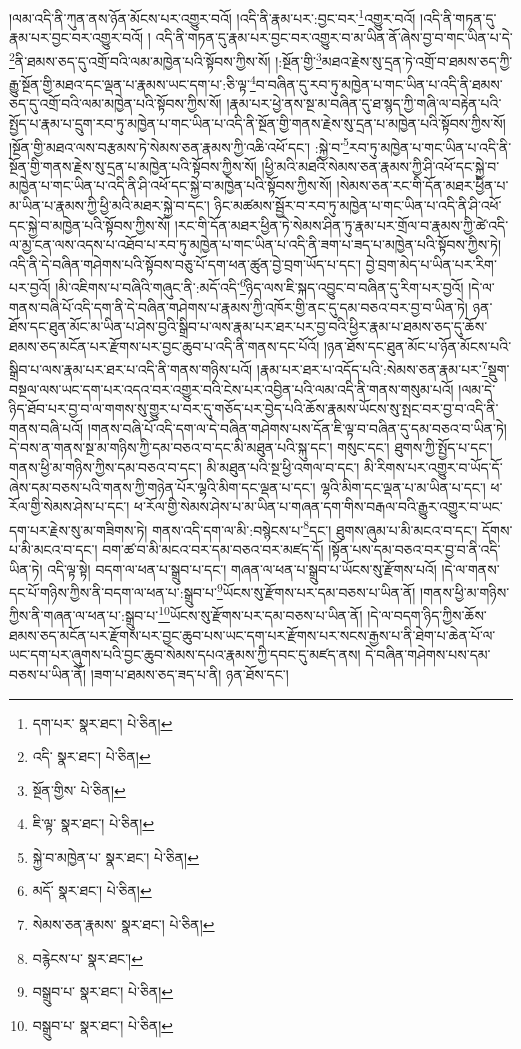 །ལམ་འདི་ནི་ཀུན་ནས་ཉོན་མོངས་པར་འགྱུར་བའོ། །འདི་ནི་རྣམ་པར་:བྱང་བར་\footnote{དག་པར་  སྣར་ཐང་།  པེ་ཅིན། }འགྱུར་བའོ། །འདི་ནི་གཏན་དུ་རྣམ་པར་བྱང་བར་འགྱུར་བའོ། །
འདི་ནི་གཏན་དུ་རྣམ་པར་བྱང་བར་འགྱུར་བ་མ་ཡིན་ནོ་ཞེས་བྱ་བ་གང་ཡིན་པ་དེ་\footnote{འདི་  སྣར་ཐང་།  པེ་ཅིན། }ནི་ཐམས་ཅད་དུ་འགྲོ་བའི་ལམ་མཁྱེན་པའི་སྟོབས་ཀྱིས་སོ། །:སྔོན་གྱི་\footnote{སྔོན་གྱིས་  པེ་ཅིན། }མཐའ་རྗེས་སུ་དྲན་ཏེ་འགྲོ་བ་ཐམས་ཅད་ཀྱི་རྒྱུ་སྔོན་གྱི་མཐའ་དང་ལྡན་པ་རྣམས་ཡང་དག་པ་:ཅི་ལྟ་\footnote{ཇི་ལྟ་  སྣར་ཐང་།  པེ་ཅིན། }བ་བཞིན་དུ་རབ་ཏུ་མཁྱེན་པ་གང་ཡིན་པ་འདི་ནི་ཐམས་ཅད་དུ་འགྲོ་བའི་ལམ་མཁྱེན་པའི་སྟོབས་ཀྱིས་སོ། །རྣམ་པར་ཕྱེ་ནས་སྔ་མ་བཞིན་དུ་ཐ་སྙད་ཀྱི་གཞི་ལ་བརྟེན་པའི་སྤྱོད་པ་རྣམ་པ་དྲུག་རབ་ཏུ་མཁྱེན་པ་གང་ཡིན་པ་འདི་ནི་སྔོན་གྱི་གནས་རྗེས་སུ་དྲན་པ་མཁྱེན་པའི་སྟོབས་ཀྱིས་སོ། །སྔོན་གྱི་མཐའ་ལས་བརྩམས་ཏེ་སེམས་ཅན་རྣམས་ཀྱི་འཆི་འཕོ་དང་། :སྐྱེ་བ་\footnote{སྐྱེ་བ་མཁྱེན་པ་  སྣར་ཐང་།  པེ་ཅིན། }རབ་ཏུ་མཁྱེན་པ་གང་ཡིན་པ་འདི་ནི་སྔོན་གྱི་གནས་རྗེས་སུ་དྲན་པ་མཁྱེན་པའི་སྟོབས་ཀྱིས་སོ། །ཕྱི་མའི་མཐའི་སེམས་ཅན་རྣམས་ཀྱི་ཤི་འཕོ་དང་སྐྱེ་བ་མཁྱེན་པ་གང་ཡིན་པ་འདི་ནི་ཤི་འཕོ་དང་སྐྱེ་བ་མཁྱེན་པའི་སྟོབས་ཀྱིས་སོ། །སེམས་ཅན་རང་གི་དོན་མཐར་ཕྱིན་པ་མ་ཡིན་པ་རྣམས་ཀྱི་ཕྱི་མའི་མཐར་སྐྱེ་བ་དང་། ཉིང་མཚམས་སྦྱོར་བ་རབ་ཏུ་མཁྱེན་པ་གང་ཡིན་པ་འདི་ནི་ཤི་འཕོ་དང་སྐྱེ་བ་མཁྱེན་པའི་སྟོབས་ཀྱིས་སོ། །རང་གི་དོན་མཐར་ཕྱིན་ཏེ་སེམས་ཤིན་ཏུ་རྣམ་པར་གྲོལ་བ་རྣམས་ཀྱི་ཚེ་འདི་ལ་མྱ་ངན་ལས་འདས་པ་འཐོབ་པ་རབ་ཏུ་མཁྱེན་པ་གང་ཡིན་པ་འདི་ནི་ཟག་པ་ཟད་པ་མཁྱེན་པའི་སྟོབས་ཀྱིས་ཏེ། འདི་ནི་དེ་བཞིན་གཤེགས་པའི་སྟོབས་བཅུ་པོ་དག་ཕན་ཚུན་བྱེ་བྲག་ཡོད་པ་དང་། བྱེ་བྲག་མེད་པ་ཡིན་པར་རིག་པར་བྱའོ། །མི་འཇིགས་པ་བཞིའི་གཞུང་ནི་:མདོ་འདི་\footnote{མདོ་  སྣར་ཐང་།  པེ་ཅིན། }ཉིད་ལས་ཇི་སྐད་འབྱུང་བ་བཞིན་དུ་རིག་པར་བྱའོ། །དེ་ལ་གནས་བཞི་པོ་འདི་དག་ནི་དེ་བཞིན་གཤེགས་པ་རྣམས་ཀྱི་འཁོར་གྱི་ནང་དུ་དམ་བཅའ་བར་བྱ་བ་ཡིན་ཏེ། ཉན་ཐོས་དང་ཐུན་མོང་མ་ཡིན་པ་ཤེས་བྱའི་སྒྲིབ་པ་ལས་རྣམ་པར་ཐར་པར་བྱ་བའི་ཕྱིར་རྣམ་པ་ཐམས་ཅད་དུ་ཆོས་ཐམས་ཅད་མངོན་པར་རྫོགས་པར་བྱང་ཆུབ་པ་འདི་ནི་གནས་དང་པོའོ། །ཉན་ཐོས་དང་ཐུན་མོང་པ་ཉོན་མོངས་པའི་སྒྲིབ་པ་ལས་རྣམ་པར་ཐར་པ་འདི་ནི་གནས་གཉིས་པའོ། །རྣམ་པར་ཐར་པ་འདོད་པའི་:སེམས་ཅན་རྣམ་པར་\footnote{སེམས་ཅན་རྣམས་  སྣར་ཐང་།  པེ་ཅིན། }སྡུག་བསྔལ་ལས་ཡང་དག་པར་འདའ་བར་འགྱུར་བའི་ངེས་པར་འབྱིན་པའི་ལམ་འདི་ནི་གནས་གསུམ་པའོ། །ལམ་དེ་ཉིད་ཐོབ་པར་བྱ་བ་ལ་གགས་སུ་གྱུར་པ་བར་དུ་གཅོད་པར་བྱེད་པའི་ཆོས་རྣམས་ཡོངས་སུ་སྤང་བར་བྱ་བ་འདི་ནི་གནས་བཞི་པའོ། །གནས་བཞི་པོ་འདི་དག་ལ་དེ་བཞིན་གཤེགས་པས་དོན་ཇི་ལྟ་བ་བཞིན་དུ་དམ་བཅའ་བ་ཡིན་ཏེ། དེ་བས་ན་གནས་སྔ་མ་གཉིས་ཀྱི་དམ་བཅའ་བ་དང་མི་མཐུན་པའི་སྐུ་དང་། གསུང་དང་། ཐུགས་ཀྱི་སྤྱོད་པ་དང་། གནས་ཕྱི་མ་གཉིས་ཀྱིས་དམ་བཅའ་བ་དང་། མི་མཐུན་པའི་སྔ་ཕྱི་འགལ་བ་དང་། མི་རིགས་པར་འགྱུར་བ་ཡོད་དོ་ཞེས་དམ་བཅས་པའི་གནས་ཀྱི་གཉེན་པོར་ལྷའི་མིག་དང་ལྡན་པ་དང་། ལྷའི་མིག་དང་ལྡན་པ་མ་ཡིན་པ་དང་། ཕ་རོལ་གྱི་སེམས་ཤེས་པ་དང་། ཕ་རོལ་གྱི་སེམས་ཤེས་པ་མ་ཡིན་པ་གཞན་དག་གིས་བརྒལ་བའི་རྒྱུར་འགྱུར་བ་ཡང་དག་པར་རྗེས་སུ་མ་གཟིགས་ཏེ། གནས་འདི་དག་ལ་མི་:བསྙེངས་པ་\footnote{བརྙེངས་པ་  སྣར་ཐང་། }དང་། ཐུགས་ཞུམ་པ་མི་མངའ་བ་དང་། དོགས་པ་མི་མངའ་བ་དང་། བག་ཚ་བ་མི་མངའ་བར་དམ་བཅའ་བར་མཛད་དོ། །སྟོན་པས་དམ་བཅའ་བར་བྱ་བ་ནི་འདི་ཡིན་ཏེ། འདི་ལྟ་སྟེ། བདག་ལ་ཕན་པ་སྒྲུབ་པ་དང་། གཞན་ལ་ཕན་པ་སྒྲུབ་པ་ཡོངས་སུ་རྫོགས་པའོ། །དེ་ལ་གནས་དང་པོ་གཉིས་ཀྱིས་ནི་བདག་ལ་ཕན་པ་:སྒྲུབ་པ་\footnote{བསྒྲུབ་པ་  སྣར་ཐང་།  པེ་ཅིན། }ཡོངས་སུ་རྫོགས་པར་དམ་བཅས་པ་ཡིན་ནོ། །གནས་ཕྱི་མ་གཉིས་ཀྱིས་ནི་གཞན་ལ་ཕན་པ་:སྒྲུབ་པ་\footnote{བསྒྲུབ་པ་  སྣར་ཐང་།  པེ་ཅིན། }ཡོངས་སུ་རྫོགས་པར་དམ་བཅས་པ་ཡིན་ནོ། །དེ་ལ་བདག་ཉིད་ཀྱིས་ཆོས་ཐམས་ཅད་མངོན་པར་རྫོགས་པར་བྱང་ཆུབ་པས་ཡང་དག་པར་རྫོགས་པར་སངས་རྒྱས་པ་ནི་ཐེག་པ་ཆེན་པོ་ལ་ཡང་དག་པར་ཞུགས་པའི་བྱང་ཆུབ་སེམས་དཔའ་རྣམས་ཀྱི་དབང་དུ་མཛད་ནས། དེ་བཞིན་གཤེགས་པས་དམ་བཅས་པ་ཡིན་ནོ། །ཟག་པ་ཐམས་ཅད་ཟད་པ་ནི། ཉན་ཐོས་དང་། 